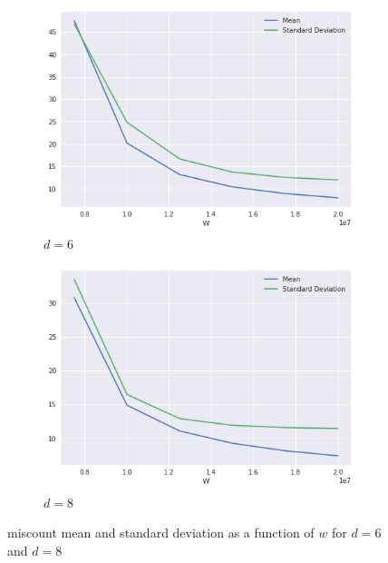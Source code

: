 \begin{figure}[htb]
    \centering
    \begin{subfigure}{.5\textwidth}
        \centering
        \includegraphics[width=\textwidth]{figures/e_coli-error_mean_stddev-K31-D6-T40}
        \caption{$d = 6$}\label{fig:ecoli-art-dbcm-errors-d6}
    \end{subfigure}%
    \begin{subfigure}{.5\textwidth}
        \centering
        \includegraphics[width=\textwidth]{figures/e_coli-error_mean_stddev-K31-D8-T40}
        \caption{$d = 8$}\label{fig:ecoli-art-dbcm-errors-d8}
    \end{subfigure}
	\caption{\dBCM miscount mean and standard deviation as a function of $w$ for $d = 6$ and $d = 8$}\label{fig:ecoli-art-dbcm-errors}
\end{figure}

